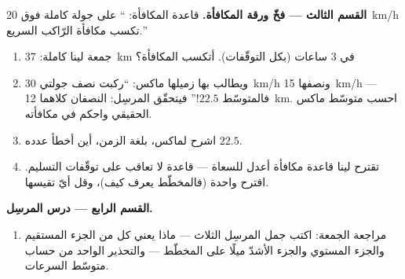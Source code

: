 \begin{problem}
\medskip\noindent\textbf{القسم الثالث --- فخّ ورقة المكافأة.}
قاعدة المكافأة: `` على جولة كاملة فوق
\qty{20}{km/h} تكسب مكافأة الرّاكب السريع.''
\begin{enumerate}[resume]
  \item جمعة لينا كاملة: \qty{37}{km} في $3$ ساعات (بكل
        التوقّفات). أتكسب المكافأة؟
  \item ويطالب بها زميلها ماكس: ``ركبت نصف جولتي 
        \qty{30}{km/h} ونصفها  \qty{15}{km/h} ---
        فالمتوسّط $22.5$!'' فيتحقّق المرسِل: النصفان كلاهما
        \qty{12}{km}. احسب متوسّط ماكس الحقيقي واحكم في
        مكافأته.
  \item اشرح لماكس، بلغة الزمن، أين أخطأ عدده $22.5$.
  \item تقترح لينا قاعدة مكافأة أعدل للسعاة --- قاعدة لا
        تعاقب على توقّفات التسليم. اقترح واحدة (فالمخطّط يعرف
        كيف)، وقل أيّ  تقيسها.
\end{enumerate}

\medskip\noindent\textbf{القسم الرابع --- درس المرسِل.}
\begin{enumerate}[resume]
  \item مراجعة الجمعة: اكتب جمل المرسِل الثلاث --- ماذا يعني
        كل من الجزء المستقيم والجزء المستوي والجزء الأشدّ
        ميلًا على المخطّط --- والتحذير الواحد من حساب متوسّط
        السرعات.
\end{enumerate}
\end{problem}

